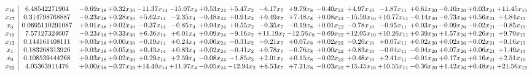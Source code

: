 \documentclass[9pt]{article}
\begin{document}
\[\begin{array}{c| c c@{\hskip 2pt} c@{\hskip 2pt} c@{\hskip 2pt} c@{\hskip 2pt} c@{\hskip 2pt} c@{\hskip 2pt} c@{\hskip 2pt} c@{\hskip 2pt} c@{\hskip 2pt} c@{\hskip 2pt} c@{\hskip 2pt} c@{\hskip 2pt} c@{\hskip 2pt} c@{\hskip 2pt} c@{\hskip 2pt} }
 x_{16}   &  6.48542271904 & -0.69 x_{18} & +  0.32 x_{30} & -11.37 x_{14} & -15.07 x_{4} & +  0.53 x_{24} & +  5.47 x_{2} & -6.17 x_{7} & +  9.79 x_{8} & -0.40 x_{22} & +  4.97 x_{10} & -1.87 x_{11} & +  0.61 x_{20} & -0.10 x_{26} & +  0.03 x_{21} & + 11.45 x_{15}\\
 x_{17}   &  0.314798768887 & -0.23 x_{18} & +  0.28 x_{30} & +  5.62 x_{14} & -2.35 x_{4} & -0.48 x_{24} & +  0.91 x_{2} & +  0.49 x_{7} & +  7.48 x_{8} & +  0.08 x_{22} & -15.59 x_{10} & + 10.77 x_{11} & -0.14 x_{20} & -0.73 x_{26} & +  0.56 x_{21} & +  4.84 x_{15}\\
 x_{3}   &  0.0695110291087 & +  0.01 x_{18} & +  0.02 x_{30} & -0.37 x_{14} & -0.85 x_{4} & +  0.04 x_{24} & +  0.55 x_{2} & -0.35 x_{7} & -0.19 x_{8} & +  0.01 x_{22} & -0.78 x_{10} & -0.95 x_{11} & +  0.03 x_{20} & -0.09 x_{26} & -0.02 x_{21} & -0.85 x_{15}\\
 x_{19}   &  7.57127324607 & -0.23 x_{18} & +  0.33 x_{30} & +  6.36 x_{14} & +  6.01 x_{4} & +  0.09 x_{24} & -9.16 x_{2} & + 11.19 x_{7} & -12.56 x_{8} & -0.69 x_{22} & + 12.05 x_{10} & + 10.26 x_{11} & +  0.39 x_{20} & +  1.57 x_{26} & +  0.26 x_{21} & +  9.70 x_{15}\\
 x_{12}   &  0.144161408111 & +  0.03 x_{18} & +  0.00 x_{30} & -0.19 x_{14} & +  0.24 x_{4} & +  0.00 x_{24} & -0.31 x_{2} & -0.21 x_{7} & +  0.07 x_{8} & +  0.02 x_{22} & -0.20 x_{10} & +  0.07 x_{11} & +  0.02 x_{20} & +  0.02 x_{26} & -0.02 x_{21} & -0.16 x_{15}\\
 x_{1}   &  0.183268313926 & +  0.03 x_{18} & +  0.05 x_{30} & +  0.43 x_{14} & +  0.83 x_{4} & +  0.02 x_{24} & -0.41 x_{2} & +  0.78 x_{7} & -0.76 x_{8} & +  0.00 x_{22} & +  0.83 x_{10} & -0.04 x_{11} & -0.04 x_{20} & +  0.07 x_{26} & +  0.06 x_{21} & +  1.49 x_{15}\\
 x_{9}   &  0.108539444268 & +  0.03 x_{18} & +  0.02 x_{30} & +  0.29 x_{14} & +  2.59 x_{4} & -0.08 x_{24} & -1.85 x_{2} & +  2.01 x_{7} & +  0.15 x_{8} & -0.02 x_{22} & +  0.48 x_{10} & +  2.41 x_{11} & -0.01 x_{20} & +  0.17 x_{26} & +  0.16 x_{21} & +  2.51 x_{15}\\
 x_{23}   &  4.05363911476 & +  0.00 x_{18} & -0.27 x_{30} & + 14.40 x_{14} & + 11.97 x_{4} & -0.05 x_{24} & -12.94 x_{2} & +  8.53 x_{7} & +  7.21 x_{8} & -0.03 x_{22} & + 15.45 x_{10} & + 10.55 x_{11} & -0.36 x_{20} & +  1.42 x_{26} & +  0.48 x_{21} & + 21.56 x_{15}\\

\end{array}\]
\end{document}
